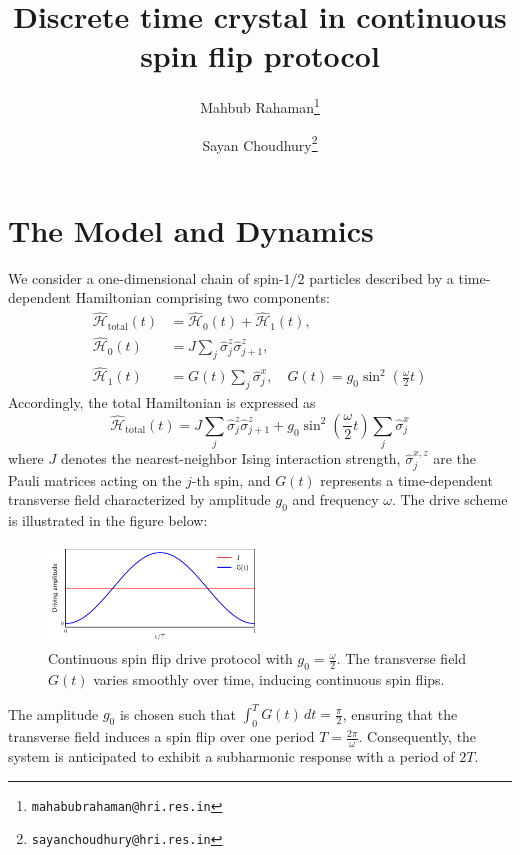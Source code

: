 \documentclass[a4paper, 11pt]{article}
\title{Discrete time crystal in continuous spin flip protocol}
\author[1]{Mahbub Rahaman\thanks{\texttt{mahabubrahaman@hri.res.in}}}
\author[1]{Sayan Choudhury\thanks{\texttt{sayanchoudhury@hri.res.in}}}
\affil[1]{\small Harish-Chandra Research Institute, HBNI, Chhatnag Road, Jhunsi, Praygraj, UP - 211019, India}
\date{}
\begin{document}
\maketitle

\section{The Model and Dynamics}
We consider a one-dimensional chain of spin-$1/2$ particles described by a time-dependent Hamiltonian comprising two components:
\begin{align}
    \hat{\mathcal{H}}_{\text{total}}(t) &=  \hat{\mathcal{H}}_0(t) + \hat{\mathcal{H}}_1(t), \\
    \hat{\mathcal{H}}_0(t) &= J\sum_{j} \hat{\sigma}_j^z \hat{\sigma}_{j+1}^z, \\
    \hat{\mathcal{H}}_1(t) &= G(t)\sum_{j}\hat{\sigma}_j^x, \quad G(t) = g_0\sin^2\left(\frac{\omega}{2} t\right)
\end{align}
Accordingly, the total Hamiltonian is expressed as
\begin{equation}
    \boxed{
        \hat{\mathcal{H}}_{\text{total}}(t) =  J\sum_{j} \hat{\sigma}_j^z \hat{\sigma}_{j+1}^z + g_0\sin^2\left(\frac{\omega}{2} t\right)\sum_{j}\hat{\sigma}_j^x
    }
\end{equation}
where $J$ denotes the nearest-neighbor Ising interaction strength, $\hat{\sigma}_j^{x,z}$ are the Pauli matrices acting on the $j$-th spin, and $G(t)$ represents a time-dependent transverse field characterized by amplitude $g_0$ and frequency $\omega$. 
The drive scheme is illustrated in the figure below:
\begin{figure}[h!]
    \centering
    \includegraphics[width=0.5\textwidth]{continuous_flip_drive.pdf}
    \caption{Continuous spin flip drive protocol with $g_0 = \frac{\omega}{2}$. The transverse field $G(t)$ varies smoothly over time, inducing continuous spin flips.}
\end{figure}
The amplitude $g_0$ is chosen such that $\displaystyle \int_0^T G(t)\,dt = \frac{\pi}{2}$, ensuring that the transverse field induces a spin flip over one period $T = \frac{2\pi}{\omega}$. Consequently, the system is anticipated to exhibit a subharmonic response with a period of $2T$.
\end{document}
